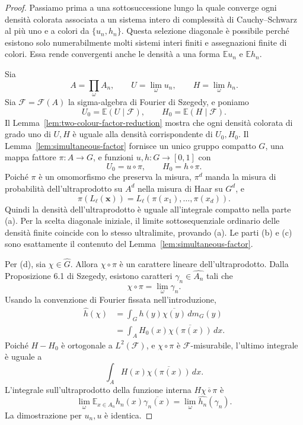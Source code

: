\documentclass[11pt]{article}
\numberwithin{equation}{section}
\newcommand{\E}{\mathbb E}
\newcommand{\1}{\mathbf 1}
\newcommand{\calF}{\mathcal F}
\begin{document}
\begin{proof}
Passiamo prima a una sottosuccessione lungo la quale converge ogni densità colorata associata a un sistema intero di complessità di Cauchy--Schwarz al più uno e a colori da \(\{u_n,h_n\}\). Questa selezione diagonale è possibile perché esistono solo numerabilmente molti sistemi interi finiti e assegnazioni finite di colori. Essa rende convergenti anche le densità a una forma \(\E u_n\) e \(\E h_n\).

Sia
\[
        A=\prod_\omega A_n,
        \qquad
        U=\lim_\omega u_n,
        \qquad
        H=\lim_\omega h_n.
\]
Sia \(\calF=\calF(A)\) la sigma-algebra di Fourier di Szegedy, e poniamo
\[
        U_0=\E(U\mid\calF),
        \qquad
        H_0=\E(H\mid\calF).
\]
Il Lemma~\ref{lem:two-colour-factor-reduction} mostra che ogni densità colorata di grado uno di \(U,H\) è uguale alla densità corrispondente di \(U_0,H_0\). Il Lemma~\ref{lem:simultaneous-factor} fornisce un unico gruppo compatto \(G\), una mappa fattore \(\pi:A\to G\), e funzioni \(u,h:G\to[0,1]\) con
\[
        U_0=u\circ\pi,
        \qquad
        H_0=h\circ\pi.
\]
Poiché \(\pi\) è un omomorfismo che preserva la misura, \(\pi^d\) manda la misura di probabilità dell'ultraprodotto su \(A^d\) nella misura di Haar su \(G^d\), e
\[
        \pi(L_\ell(\mathbf x))
        =
        L_\ell(\pi(x_1),\ldots,\pi(x_d)).
\]
Quindi la densità dell'ultraprodotto è uguale all'integrale compatto nella parte (a). Per la scelta diagonale iniziale, il limite sottosequenziale ordinario delle densità finite coincide con lo stesso ultralimite, provando (a). Le parti (b) e (c) sono esattamente il contenuto del Lemma~\ref{lem:simultaneous-factor}.

Per (d), sia \(\chi\in\widehat G\). Allora \(\chi\circ\pi\) è un carattere lineare dell'ultraprodotto. Dalla Proposizione 6.1 di Szegedy, esistono caratteri \(\gamma_n\in\widehat{A_n}\) tali che
\[
        \chi\circ\pi=\lim_\omega \gamma_n.
\]
Usando la convenzione di Fourier fissata nell'introduzione,
\[
\begin{aligned}
        \widehat h(\chi)
        &=\int_G h(y)\overline{\chi(y)}\,dm_G(y) \\
        &=\int_A H_0(x)\overline{\chi(\pi(x))}\,dx.
\end{aligned}
\]
Poiché \(H-H_0\) è ortogonale a \(L^2(\calF)\), e \(\chi\circ\pi\) è \(\calF\)-misurabile, l'ultimo integrale è uguale a
\[
        \int_A H(x)\overline{\chi(\pi(x))}\,dx.
\]
L'integrale sull'ultraprodotto della funzione interna \(H\overline{\chi\circ\pi}\) è
\[
        \lim_\omega \E_{x\in A_n}h_n(x)\overline{\gamma_n(x)}
        =
        \lim_\omega \widehat{h_n}(\gamma_n).
\]
La dimostrazione per \(u_n,u\) è identica.
\end{proof}
\end{document}
